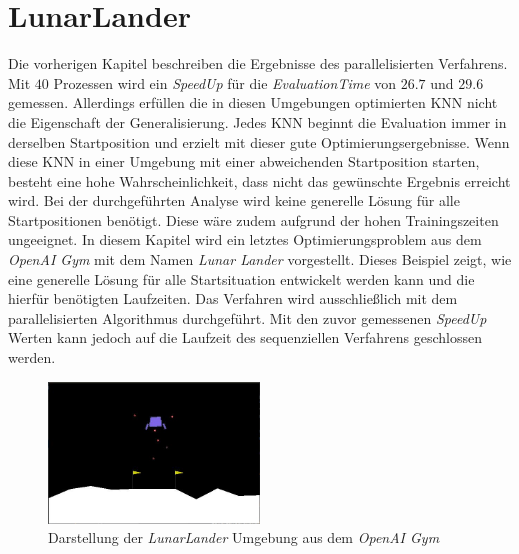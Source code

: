 \section{LunarLander}
\label{sec:lunar_lander}
Die vorherigen Kapitel beschreiben die Ergebnisse des parallelisierten Verfahrens. Mit $40$ Prozessen wird ein \emph{SpeedUp} für die \emph{EvaluationTime} von $26.7$ und $29.6$ gemessen. Allerdings erfüllen die in diesen Umgebungen optimierten \ac{KNN} nicht die Eigenschaft der Generalisierung. Jedes \ac{KNN} beginnt die Evaluation immer in derselben Startposition und erzielt mit dieser gute Optimierungsergebnisse. Wenn diese \ac{KNN} in einer Umgebung mit einer abweichenden Startposition starten, besteht eine hohe Wahrscheinlichkeit, dass nicht das gewünschte Ergebnis erreicht wird. Bei der durchgeführten Analyse wird keine generelle Lösung für alle Startpositionen benötigt. Diese wäre zudem aufgrund der hohen Trainingszeiten ungeeignet. In diesem Kapitel wird ein letztes Optimierungsproblem aus dem \emph{OpenAI Gym} mit dem Namen \emph{Lunar Lander} vorgestellt. Dieses Beispiel zeigt, wie eine generelle Lösung für alle Startsituation entwickelt werden kann und die hierfür benötigten Laufzeiten. 
Das Verfahren wird ausschließlich mit dem parallelisierten Algorithmus durchgeführt. Mit den zuvor gemessenen \emph{SpeedUp} Werten kann jedoch auf die Laufzeit des sequenziellen Verfahrens geschlossen werden.
\begin{figure}[!h]
	\centering
	\includegraphics[width=0.5\textwidth]{./img/lunar_lander_env.JPG} 
	\caption{Darstellung der \emph{LunarLander} Umgebung aus dem \emph{OpenAI Gym}}
	\label{fig:lunar_lander_env}
\end{figure} 
\\\\
